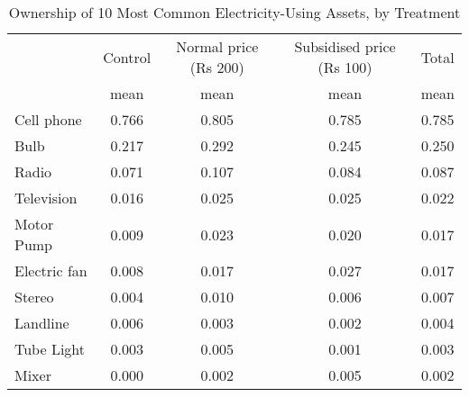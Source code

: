 \begin{table}[htbp]\centering
\def\sym#1{\ifmmode^{#1}\else\(^{#1}\)\fi}
\caption{Ownership of 10 Most Common Electricity-Using Assets, by Treatment \label{tab:"label"}}
\begin{tabular*}{0.9\hsize}{@{\hskip\tabcolsep\extracolsep\fill}l*{4}{c}}
\toprule
                                &  Control&Normal price (Rs 200)&Subsidised price (Rs 100)&    Total\\
                                &     mean&     mean&     mean&     mean\\
\midrule
Cell phone                      &    0.766&    0.805&    0.785&    0.785\\
Bulb                            &    0.217&    0.292&    0.245&    0.250\\
Radio                           &    0.071&    0.107&    0.084&    0.087\\
Television                      &    0.016&    0.025&    0.025&    0.022\\
Motor Pump                      &    0.009&    0.023&    0.020&    0.017\\
Electric fan                    &    0.008&    0.017&    0.027&    0.017\\
Stereo                          &    0.004&    0.010&    0.006&    0.007\\
Landline                        &    0.006&    0.003&    0.002&    0.004\\
Tube Light                      &    0.003&    0.005&    0.001&    0.003\\
Mixer                           &    0.000&    0.002&    0.005&    0.002\\
\bottomrule
\end{tabular*}
\end{table}
